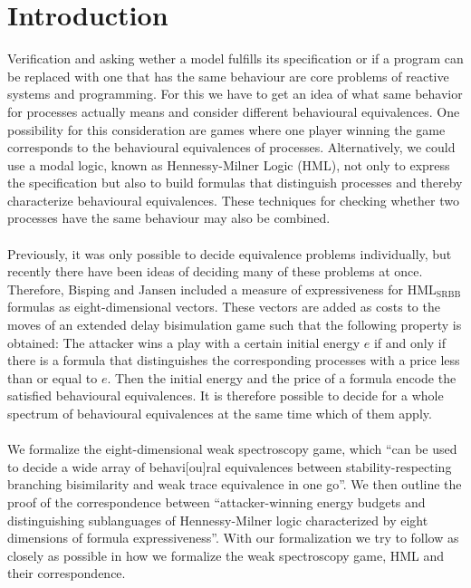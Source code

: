 \newpage
\section{Introduction} 
Verification and asking wether a model fulfills its specification or if a program can be replaced with one that has the same behaviour are core problems of reactive systems and programming.
For this we have to get an idea of what same behavior for processes actually means and consider different behavioural equivalences.
One possibility for this consideration are games where one player winning the game corresponds to the behavioural equivalences of processes.
Alternatively, we could use a modal logic, known as Hennessy-Milner Logic (HML), not only to express the specification but also to build formulas that distinguish processes and 
thereby characterize behavioural equivalences.
These techniques for checking whether two processes have the same behaviour may also be combined.
\\\\
Previously, it was only possible to decide equivalence problems individually, but recently there have been ideas of deciding many of these problems at once.
Therefore, Bisping and Jansen \cite{bisping2023lineartimebranchingtime} included a measure of expressiveness for HML$_\text{{SRBB}}$ formulas as eight-dimensional vectors.
These vectors are added as costs to the moves of an extended delay bisimulation game such that the following property is obtained: 
The attacker wins a play with a certain initial energy $e$ if and only if there is a formula that distinguishes the corresponding processes with a price less than or equal to $e$.
Then the initial energy and the price of a formula encode the satisfied behavioural equivalences.
It is therefore possible to decide for a whole spectrum of behavioural equivalences at the same time which of them apply.
\\\\
We formalize the eight-dimensional weak spectroscopy game, 
which ``can be used to decide a wide array of behavi[ou]ral equivalences between stability-respecting branching bisimilarity and weak trace equivalence in one go''\cite[Abstract]{bisping2023lineartimebranchingtime}.
We then outline the proof of the correspondence between ``attacker-winning energy budgets and distinguishing sublanguages of Hennessy-Milner logic characterized by eight dimensions of formula expressiveness''\cite[Abstract]{bisping2023lineartimebranchingtime}.
With our formalization we try to follow \cite{bisping2023lineartimebranchingtime} as closely as possible in how we formalize the weak spectroscopy game, HML and their correspondence.
